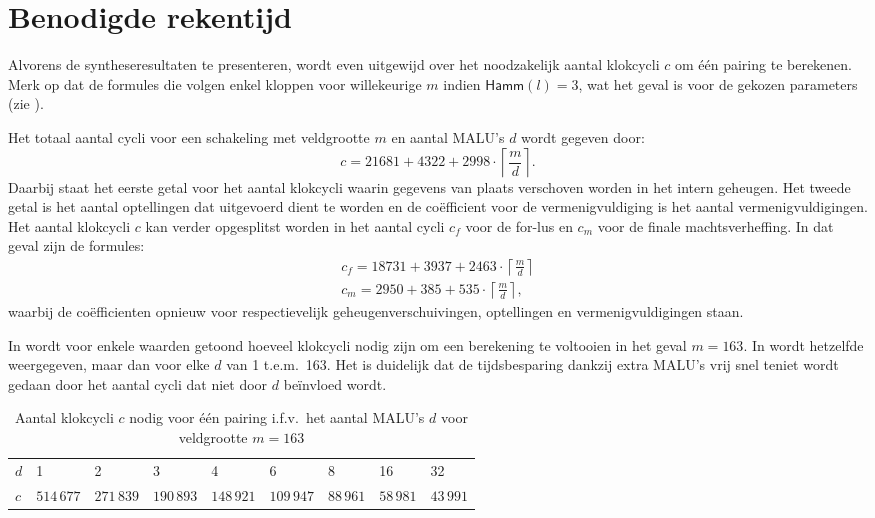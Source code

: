 \section{Benodigde rekentijd}

Alvorens de syntheseresultaten te presenteren, wordt even uitgewijd over het noodzakelijk aantal klokcycli $c$ om \'e\'en pairing te berekenen. Merk op dat de formules die volgen enkel kloppen voor willekeurige $m$ indien $\textsf{Hamm}(l) = 3$, wat het geval is voor de gekozen parameters (zie ).

Het totaal aantal cycli voor een schakeling met veldgrootte $m$ en aantal MALU's $d$ wordt gegeven door:
\[c = 21681 + 4322 + 2998 \cdot \left\lceil \frac{m}{d} \right\rceil.\]
Daarbij staat het eerste getal voor het aantal klokcycli waarin gegevens van plaats verschoven worden in het intern geheugen. Het tweede getal is het aantal optellingen dat uitgevoerd dient te worden en de co\"efficient voor de vermenigvuldiging is het aantal vermenigvuldigingen. Het aantal klokcycli $c$ kan verder opgesplitst worden in het aantal cycli $c_f$ voor de for-lus en $c_m$ voor de finale machtsverheffing. In dat geval zijn de formules:
\[\begin{gathered}
c_f = 18731 + 3937 + 2463 \cdot \left\lceil \frac{m}{d} \right\rceil\\
c_m = 2950 + 385 + 535 \cdot \left\lceil \frac{m}{d} \right\rceil,
\end{gathered}\]
waarbij de co\"efficienten opnieuw voor respectievelijk geheugenverschuivingen, optellingen en vermenigvuldigingen staan.

In  wordt voor enkele waarden getoond hoeveel klokcycli nodig zijn om een berekening te voltooien in het geval $m = 163$. In  wordt hetzelfde weergegeven, maar dan voor elke $d$ van 1 t.e.m.\ 163. Het is duidelijk dat de tijdsbesparing dankzij extra MALU's vrij snel teniet wordt gedaan door het aantal cycli dat niet door $d$ be\"invloed wordt.

\begin{table}[h]
	\caption{Aantal klokcycli $c$ nodig voor \'e\'en pairing i.f.v.\ het aantal MALU's $d$ voor veldgrootte $m = 163$}
	\label{tabel-resultaten-multi-cycles}

	\begin{narrow}{-1cm}{-1cm}
		\centering
		\begin{tabular}{lllllllll}
			\toprule
			$d$	& 1	& 2	& 3	& 4	& 6	& 8	& 16	& 32\\
			$c$	& $514\,677$	& $271\,839$	& $190\,893$	& $148\,921$	& $109\,947$	& $88\,961$	& $58\,981$	& $43\,991$\\
			\bottomrule	
		\end{tabular}
	\end{narrow}
\end{table}

